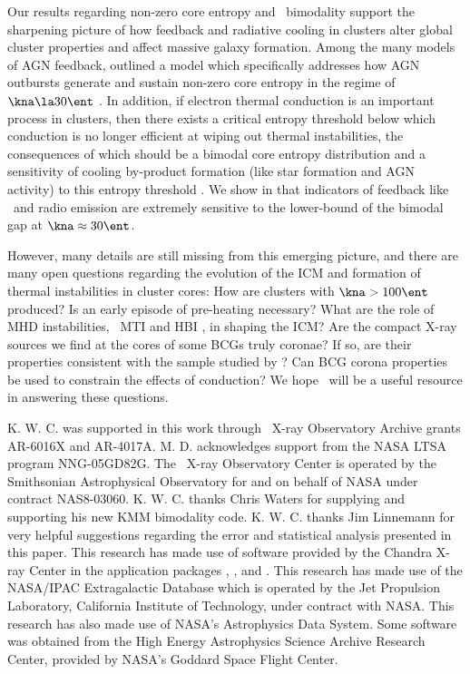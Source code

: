 \documentclass{emulateapj}
\begin{document}
Our results regarding non-zero core entropy and \kna\ bimodality
support the sharpening picture of how feedback and radiative cooling
in clusters alter global cluster properties and affect massive galaxy
formation. Among the many models of AGN feedback,
\citet{agnframework} outlined a model which specifically addresses how
AGN outbursts generate and sustain non-zero core entropy in the regime
of $\kna \la 30 \ent$ \citep[see also][]{kaiser03}. In addition, if
electron thermal conduction is an important process in clusters, then
there exists a critical entropy threshold below which conduction is no
longer efficient at wiping out thermal instabilities, the consequences
of which should be a bimodal core entropy distribution and a
sensitivity of cooling by-product formation (like star formation and
AGN activity) to this entropy threshold \citep{conduction,
2008arXiv0804.3823G}. We show in \citet{haradent} that indicators of
feedback like \halpha\ and radio emission are extremely sensitive to
the lower-bound of the bimodal gap at $\kna \approx 30 \ent$.

However, many details are still missing from this emerging picture,
and there are many open questions regarding the evolution of the ICM
and formation of thermal instabilities in cluster cores: How are
clusters with $\kna > 100 \ent$ produced? Is an early episode of
pre-heating necessary? What are the role of MHD instabilities, \eg\
MTI \citep{2000ApJ...534..420B, 2008ApJ...673..758Q} and HBI
\citep{2008ApJ...677L...9P}, in shaping the ICM?  Are the compact
X-ray sources we find at the cores of some BCGs truly coronae? If so,
are their properties consistent with the sample studied by
\citet{coronae}? Can BCG corona properties be used to constrain the
effects of conduction? We hope \accept\ will be a useful resource in
answering these questions.

\acknowledgements

K. W. C. was supported in this work through \chandra\ X-ray
Observatory Archive grants AR-6016X and AR-4017A. M. D. acknowledges
support from the NASA LTSA program NNG-05GD82G. The \chandra\ X-ray
Observatory Center is operated by the Smithsonian Astrophysical
Observatory for and on behalf of NASA under contract
NAS8-03060. K. W. C. thanks Chris Waters for supplying and supporting
his new KMM bimodality code. K. W. C. thanks Jim Linnemann for very
helpful suggestions regarding the error and statistical analysis
presented in this paper. This research has made use of software
provided by the Chandra X-ray Center in the application packages
\ciao, \chips, and \sherpa. This research has made use of the
NASA/IPAC Extragalactic Database which is operated by the Jet
Propulsion Laboratory, California Institute of Technology, under
contract with NASA. This research has also made use of NASA's
Astrophysics Data System. Some software was obtained from the High
Energy Astrophysics Science Archive Research Center, provided by
NASA's Goddard Space Flight Center.
\end{document}

